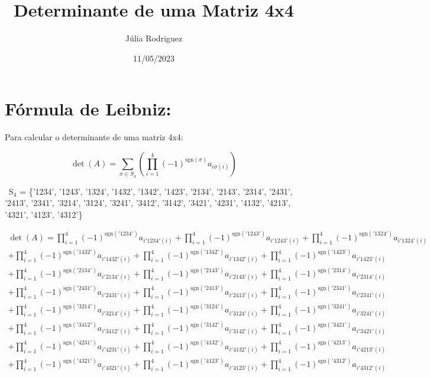 \documentclass{article}
\title{Determinante de uma Matriz 4x4}
\author{Júlia Rodriguez}
\date{11/05/2023}
\begin{document}
\maketitle

\newpage

\section{Fórmula de Leibniz:}

Para calcular o determinante de uma matriz 4x4: 

\[
\det(A) = \sum_{\sigma \in S_4} \left( \prod_{i=1}^{4} (-1)^{\mathrm{sgn}(\sigma)} a_{i\sigma(i)} \right)
\]\newline

\ {S}$_4$ = \{'1234', '1243', '1324', '1432', '1342', '1423', 
'2134', '2143', '2314', '2431', '2413', '2341', 
'3214', '3124', '3241', '3412', '3142', '3421', 
'4231', '4132', '4213', '4321', '4123', '4312'\}\newline

\begin{equation*}
    \begin{split}
    \det(A)=
    \prod_{i=1}^{4} (-1)^{\mathrm{sgn}('1234')} a_{i'1234'(i)} 
    + \prod_{i=1}^{4} (-1)^{\mathrm{sgn}('1243')} a_{i'1243'(i)} 
    + \prod_{i=1}^{4} (-1)^{\mathrm{sgn}('1324')} a_{i'1324'(i)}\\
    + \prod_{i=1}^{4} (-1)^{\mathrm{sgn}('1432')} a_{i'1432'(i)} 
    + \prod_{i=1}^{4} (-1)^{\mathrm{sgn}('1342')} a_{i'1342'(i)} 
    + \prod_{i=1}^{4} (-1)^{\mathrm{sgn}('1423')} a_{i'1423'(i)}\\
    + \prod_{i=1}^{4} (-1)^{\mathrm{sgn}('2134')} a_{i'2134'(i)} 
    + \prod_{i=1}^{4} (-1)^{\mathrm{sgn}('2143')} a_{i'2143'(i)} 
    + \prod_{i=1}^{4} (-1)^{\mathrm{sgn}('2314')} a_{i'2314'(i)}\\ 
    + \prod_{i=1}^{4} (-1)^{\mathrm{sgn}('2431')} a_{i'2431'(i)} 
    + \prod_{i=1}^{4} (-1)^{\mathrm{sgn}('2413')} a_{i'2413'(i)} 
    + \prod_{i=1}^{4} (-1)^{\mathrm{sgn}('2341')} a_{i'2341'(i)}\\ 
    + \prod_{i=1}^{4} (-1)^{\mathrm{sgn}('3214')} a_{i'3214'(i)} 
    + \prod_{i=1}^{4} (-1)^{\mathrm{sgn}('3124')} a_{i'3124'(i)} 
    + \prod_{i=1}^{4} (-1)^{\mathrm{sgn}('3241')} a_{i'3241'(i)}\\
    + \prod_{i=1}^{4} (-1)^{\mathrm{sgn}('3412')} a_{i'3412'(i)} 
    + \prod_{i=1}^{4} (-1)^{\mathrm{sgn}('3142')} a_{i'3142'(i)} 
    + \prod_{i=1}^{4} (-1)^{\mathrm{sgn}('3421')} a_{i'3421'(i)}\\
    + \prod_{i=1}^{4} (-1)^{\mathrm{sgn}('4231')} a_{i'4231'(i)}
    + \prod_{i=1}^{4} (-1)^{\mathrm{sgn}('4132')} a_{i'4132'(i)}
    + \prod_{i=1}^{4} (-1)^{\mathrm{sgn}('4213')} a_{i'4213'(i)}\\
    + \prod_{i=1}^{4} (-1)^{\mathrm{sgn}('4321')} a_{i'4321'(i)}
    + \prod_{i=1}^{4} (-1)^{\mathrm{sgn}('4123')} a_{i'4123'(i)}
    + \prod_{i=1}^{4} (-1)^{\mathrm{sgn}('4312')} a_{i'4312'(i)}
    \end{split}
\end{equation*}
\end{document}
